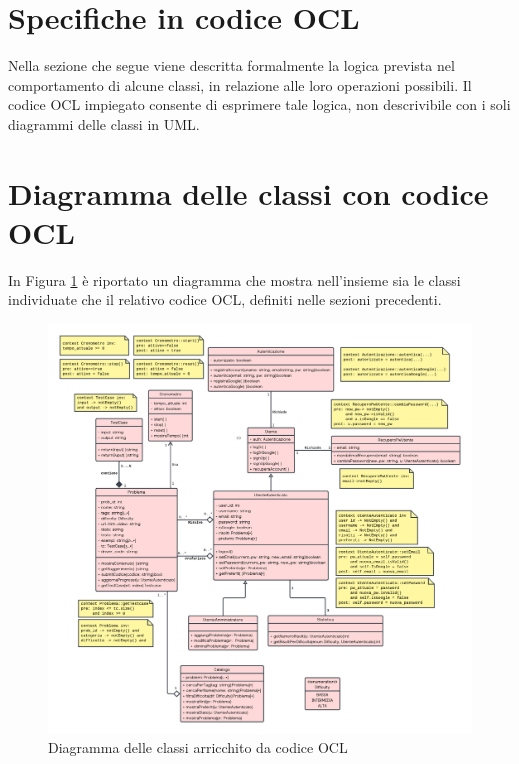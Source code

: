 \documentclass[11pt, a4paper]{article}
\theoremstyle{definition} %
\begin{document}
\newpage
\section{Specifiche in codice OCL}
Nella sezione che segue viene descritta formalmente la logica prevista
nel comportamento di alcune classi, in relazione alle loro operazioni
possibili. Il codice OCL impiegato consente di esprimere tale logica,
non descrivibile con i soli diagrammi delle classi in UML.















\newpage
\section{Diagramma delle classi con codice OCL}
In Figura \ref{umlocl} è riportato un diagramma che mostra nell'insieme
sia le classi individuate che il relativo codice OCL, definiti nelle
sezioni precedenti.

\begin{figure}[H]
\centering
\hspace*{-2.8cm}
\includegraphics[scale = 0.53]{materiale/classdiagram.pdf}
\caption{Diagramma delle classi arricchito da codice OCL}
\label{umlocl}
\end{figure}
\end{document}
